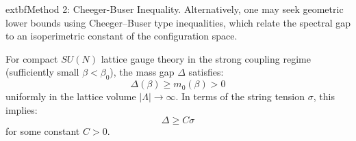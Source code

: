 		extbf{Method 2: Cheeger-Buser Inequality.}
Alternatively, one may seek geometric lower bounds using Cheeger--Buser type inequalities, which relate the spectral gap to an isoperimetric constant of the configuration space.


\begin{theorem}
\label{thm:strong-coupling-gap-rigorous}
For compact $SU(N)$ lattice gauge theory in the strong coupling regime (sufficiently small $\beta < \beta_0$), the mass gap $\Delta$ satisfies:
\begin{equation}
\Delta(\beta) \geq m_0(\beta) > 0
\end{equation}
uniformly in the lattice volume $|\Lambda| \to \infty$. In terms of the string tension $\sigma$, this implies:
\begin{equation}
\Delta \ge C \sigma
\end{equation}
for some constant $C > 0$.
\end{theorem}

